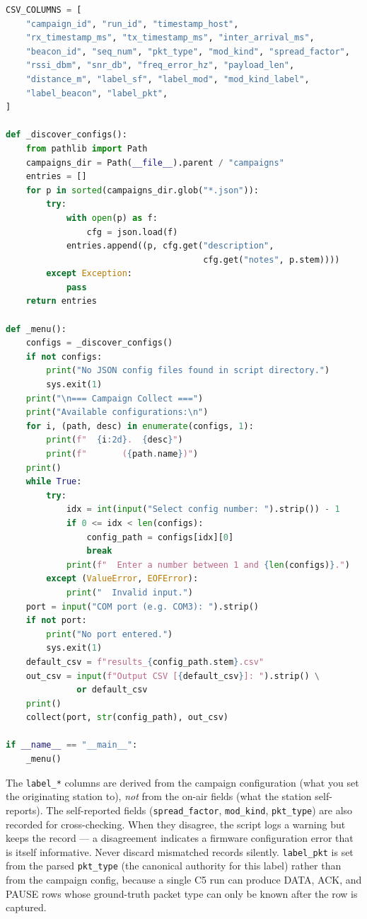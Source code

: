\documentclass[11pt,letterpaper]{article}
\begin{document}
\begin{lstlisting}[language=Python, caption={Collection script skeleton (\texttt{collect.py}).}]
CSV_COLUMNS = [
    "campaign_id", "run_id", "timestamp_host",
    "rx_timestamp_ms", "tx_timestamp_ms", "inter_arrival_ms",
    "beacon_id", "seq_num", "pkt_type", "mod_kind", "spread_factor",
    "rssi_dbm", "snr_db", "freq_error_hz", "payload_len",
    "distance_m", "label_sf", "label_mod", "mod_kind_label",
    "label_beacon", "label_pkt",
]

def _discover_configs():
    from pathlib import Path
    campaigns_dir = Path(__file__).parent / "campaigns"
    entries = []
    for p in sorted(campaigns_dir.glob("*.json")):
        try:
            with open(p) as f:
                cfg = json.load(f)
            entries.append((p, cfg.get("description",
                                       cfg.get("notes", p.stem))))
        except Exception:
            pass
    return entries

def _menu():
    configs = _discover_configs()
    if not configs:
        print("No JSON config files found in script directory.")
        sys.exit(1)
    print("\n=== Campaign Collect ===")
    print("Available configurations:\n")
    for i, (path, desc) in enumerate(configs, 1):
        print(f"  {i:2d}.  {desc}")
        print(f"       ({path.name})")
    print()
    while True:
        try:
            idx = int(input("Select config number: ").strip()) - 1
            if 0 <= idx < len(configs):
                config_path = configs[idx][0]
                break
            print(f"  Enter a number between 1 and {len(configs)}.")
        except (ValueError, EOFError):
            print("  Invalid input.")
    port = input("COM port (e.g. COM3): ").strip()
    if not port:
        print("No port entered.")
        sys.exit(1)
    default_csv = f"results_{config_path.stem}.csv"
    out_csv = input(f"Output CSV [{default_csv}]: ").strip() \
              or default_csv
    print()
    collect(port, str(config_path), out_csv)

if __name__ == "__main__":
    _menu()
\end{lstlisting}

\begin{tcolorbox}[warning={Label Integrity}]
	The \texttt{label\_*} columns are derived from the campaign configuration (what you set the originating station to), \emph{not} from the on-air fields (what the station self-reports). The self-reported fields (\texttt{spread\_factor}, \texttt{mod\_kind}, \texttt{pkt\_type}) are also recorded for cross-checking. When they disagree, the script logs a warning but keeps the record --- a disagreement indicates a firmware configuration error that is itself informative. Never discard mismatched records silently. \texttt{label\_pkt} is set from the parsed \texttt{pkt\_type} (the canonical authority for this label) rather than from the campaign config, because a single C5 run can produce DATA, ACK, and PAUSE rows whose ground-truth packet type can only be known after the row is captured.
\end{tcolorbox}
\end{document}
